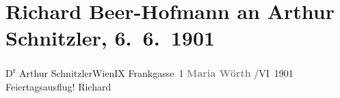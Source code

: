 

         
         \renewcommand{\erwaehntePersonen}{Personen: Richard Beer-Hofmann}
         \renewcommand{\erwaehnteOrte}{Orte: Frankgasse 1, IX., Alsergrund, Maria Wörth, Wien}
         \renewcommand{\erwaehnteWerke}{}
               \section[Richard Beer-Hofmann an Arthur Schnitzler, 6. 6. 1901]{ Richard Beer-Hofmann an Arthur Schnitzler, 6. 6. 1901}\nopagebreak{}\rehead{ }\begin{ledgroupsized}[t]{13cm}\normalsize\beginnumbering \toendnotes[C]{\smallbreak\pagebreak[2]} 
\pstart{}{\pb}D\textsuperscript{r}
                  Arthur Schnitzler\pend{}\pstart{}Wien\pend{}\pstart{}IX Frankgasse 1\pend{}{\bigskip}\pstart
           \noindent{}\centering{}\textcolor{gray}{\textbf{{\pb}Maria Wörth}}\pend
           /VI 1901\pend
           \pstart
           Feiertagsausflug!\pend
           \pstart \spacefill\mbox{Richard}\pend{}
         
         \endnumbering{}\end{ledgroupsized}  \newcommand{\dateiname}{L01124}\newcommand{\titel}{Richard Beer-Hofmann an Arthur Schnitzler, 6. 6. 1901}\newcommand{\editorInnen}{Martin Anton Müller und Gerd-Hermann Susen}
      